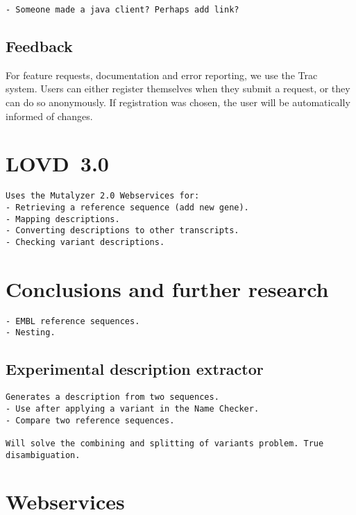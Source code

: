 \documentclass{article}
\begin{document}
\begin{verbatim}
- Someone made a java client? Perhaps add link?
\end{verbatim}

\subsection{Feedback}
For feature requests, documentation and error reporting, we use the
Trac~\cite{TRAC} system. Users can either register themselves when they submit
a request, or they can do so anonymously. If registration was chosen, the user
will be automatically informed of changes.

\section{LOVD~3.0}
\begin{verbatim}
Uses the Mutalyzer 2.0 Webservices for:
- Retrieving a reference sequence (add new gene).
- Mapping descriptions.
- Converting descriptions to other transcripts.
- Checking variant descriptions.
\end{verbatim}

\section{Conclusions and further research}\label{conclusion}
\begin{verbatim}
- EMBL reference sequences.
- Nesting.
\end{verbatim}

\subsection{Experimental description extractor}
\begin{verbatim}
Generates a description from two sequences.
- Use after applying a variant in the Name Checker.
- Compare two reference sequences.

Will solve the combining and splitting of variants problem. True
disambiguation.
\end{verbatim}

{}


\appendix

\section{Webservices} \label{sec:webservices}
\end{document}
